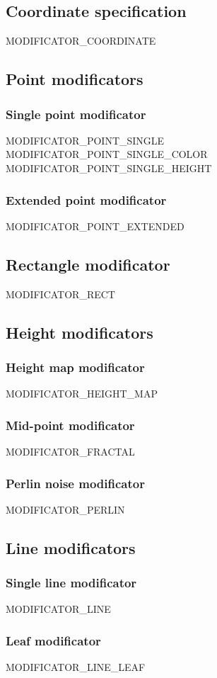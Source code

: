 \documentclass[11pt]{article}
\begin{document}
\subsection{Coordinate specification}
MODIFICATOR\_COORDINATE

\subsection{Point modificators}
\subsubsection{Single point modificator}
MODIFICATOR\_POINT\_SINGLE
MODIFICATOR\_POINT\_SINGLE\_COLOR
MODIFICATOR\_POINT\_SINGLE\_HEIGHT
\subsubsection{Extended point modificator}
MODIFICATOR\_POINT\_EXTENDED

\subsection{Rectangle modificator}
MODIFICATOR\_RECT

\subsection{Height modificators}
\subsubsection{Height map modificator}
MODIFICATOR\_HEIGHT\_MAP
\subsubsection{Mid-point modificator}
MODIFICATOR\_FRACTAL
\subsubsection{Perlin noise modificator}
MODIFICATOR\_PERLIN

\subsection{Line modificators}
\subsubsection{Single line modificator}
MODIFICATOR\_LINE
\subsubsection{Leaf modificator}
MODIFICATOR\_LINE\_LEAF
\end{document}
